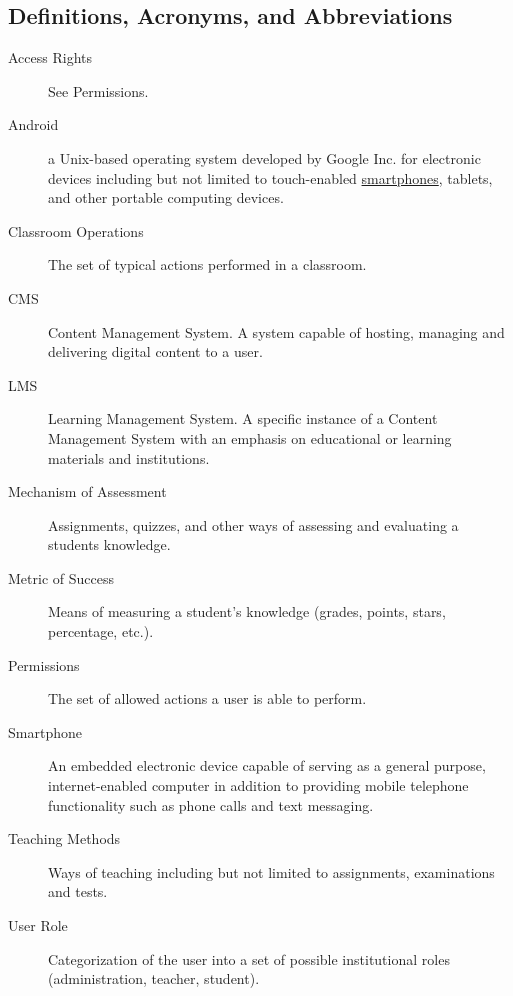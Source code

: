 \documentclass[]{article}
\begin{document}
\subsection{Definitions, Acronyms, and Abbreviations}
\label{sub:definitions_acronyms_and_abbreviations}
\begin{description}
  \item [Access Rights] See Permissions.

  \item [Android] a Unix-based operating system developed by Google Inc. for
    electronic devices including but not limited to touch-enabled
    \underline{smartphones},
    tablets, and other portable computing devices.

  \item [Classroom Operations] The set of typical actions performed in a
    classroom.

  \item [CMS] Content Management System. A system capable of hosting, managing
	and delivering digital content to a user.

  \item [LMS] Learning Management System. A specific instance of a Content
    Management System with an emphasis on educational or learning materials and
    institutions.

  \item [Mechanism of Assessment] Assignments, quizzes, and other ways of
    assessing and evaluating a students knowledge.

  \item [Metric of Success] Means of measuring a student's knowledge (grades,
    points, stars, percentage, etc.).

  \item [Permissions] The set of allowed actions a user is able to perform.

  \item [Smartphone] An embedded electronic device capable of serving as a
    general purpose, internet-enabled computer in addition to providing mobile
    telephone functionality such as phone calls and text messaging.

  \item [Teaching Methods] Ways of teaching including but not limited to
    assignments, examinations and tests.

  \item [User Role] Categorization of the user into a set of possible
    institutional roles (administration, teacher, student).


\end{description}
\end{document}
